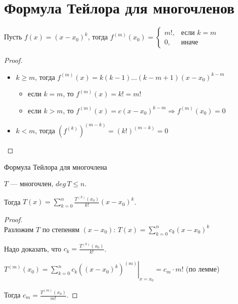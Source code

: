 \section{Формула Тейлора для многочленов}

\begin{lemma}

    Пусть $f(x) = (x -x_0)^k$, тогда $f^{(m)}(x_0) =
    \begin{cases}
        m!, &\text{если $k=m$}\\
        0, &\text{иначе}
    \end{cases}$
\end{lemma}

\begin{proof}  
    $\quad$ \\
    \begin{itemize}
        \item $k \geqslant m$, тогда $f^{(m)}(x) = k(k-1) \dots (k-m+1)(x-x_0)^{k-m}$
        \begin{itemize}
            \item если $k = m$, то $f^{(m)}(x) = k! = m!$
            \item если $k > m$, то $f^{(m)}(x) = c (x-x_0)^{k-m} \Longrightarrow f^{(m)}(x_0) = 0$
        \end{itemize}
        
        \item $k < m$, тогда $(f^{(k)})^{(m-k)} = (k!)^{(m-k)} = 0$
    \end{itemize}
\end{proof}

\begin{theorem-non}
    Формула Тейлора для многочлена

    $T$ --- многочлен, $deg \, T \leqslant n$. 

    Тогда $T(x) = \sum\limits_{k=0}^n \frac{T^{(k)}(x_0)}{k!} (x-x_0)^k$.
\end{theorem-non}
\begin{proof} $\quad$ \\
    Разложим $T$ по степеням $(x - x_0)$: $T(x) = \sum\limits_{k = 0}^{n} c_k (x-x_0)^k$
    
    Надо доказать, что $c_k = \frac{T^{(k)}(x_0)}{k!}$.

    $T^{(m)}(x_0) = \left.\sum\limits_{k = 0}^{n} c_k ((x-x_0)^k)^{(m)} \right|_{x=x_0} = c_m \cdot m!$ (по лемме)

    Тогда $c_m = \frac{T^{(m)}(x_0)}{m!}$.
\end{proof}

